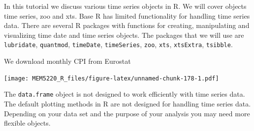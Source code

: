 \documentclass[]{book}
\newenvironment{Shaded}{\begin{snugshade}}{\end{snugshade}}
\newcommand{\CommentTok}[1]{\textcolor[rgb]{0.56,0.35,0.01}{\textit{#1}}}
\newcommand{\DataTypeTok}[1]{\textcolor[rgb]{0.13,0.29,0.53}{#1}}
\newcommand{\KeywordTok}[1]{\textcolor[rgb]{0.13,0.29,0.53}{\textbf{#1}}}
\newcommand{\NormalTok}[1]{#1}
\newcommand{\OperatorTok}[1]{\textcolor[rgb]{0.81,0.36,0.00}{\textbf{#1}}}
\newcommand{\StringTok}[1]{\textcolor[rgb]{0.31,0.60,0.02}{#1}}
\begin{document}
In this tutorial we discuss various time series objects in R. We will cover objects time series, zoo and xts. Base R has limited functionality for handling time series data. There are several R packages with functions for creating, manipulating and visualizing time date and time series objects.
The packages that we will use are \texttt{lubridate}, \texttt{quantmod}, \texttt{timeDate}, \texttt{timeSeries}, \texttt{zoo}, \texttt{xts}, \texttt{xtsExtra}, \texttt{tsibble}.

We download monthly CPI from Eurostat

\begin{Shaded}
\end{Shaded}

\texttt{[image: MEM5220\_R\_files/figure-latex/unnamed-chunk-178-1.pdf]}

The \texttt{data.frame} object is not designed to work efficiently with time series data.
The default plotting methods in R are not designed for handling time series data.
Depending on your data set and the purpose of your analysis you may need more flexible objects.
\end{document}
